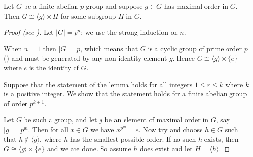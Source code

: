 \begin{lemma}\label{lemma-fundamental-theorem-of-finite-abelian-groups-2}
    Let $G$ be a finite abelian $p$-group and suppose $g \in G$ has maximal order in $G$. Then $G \cong \langle g \rangle \times H$ for some subgroup $H$ in $G$.
\end{lemma}
\begin{proof}[Proof (see {\cite[Lemma 13.9]{judson_beezer_2022}})]
    Let $|G| = p^n$; we use the strong induction on $n$.

    When $n = 1$ then $|G| = p$, which means that $G$ is a cyclic group of prime order $p$ () and must be generated by any non-identity element $g$. Hence $G \cong \langle g \rangle \times \{e\}$ where $e$ is the identity of $G$.

    Suppose that the statement of the lemma holds for all integers $1 \leq r \leq k$ where $k$ is a positive integer. We show that the statement holds for a finite abelian group of order $p^{k+1}$.

    Let $G$ be such a group, and let $g$ be an element of maximal order in $G$, say $|g| = p^m$. Then for all $x \in G$ we have $x^{p^m} = e$. Now try and choose $h \in G$ such that $h \notin \langle g \rangle$, where $h$ has the smallest possible order. If no such $h$ exists, then $G \cong \langle g \rangle \times \{e\}$ and we are done. So assume $h$ does exist and let $H = \langle h \rangle$.


\end{proof}
